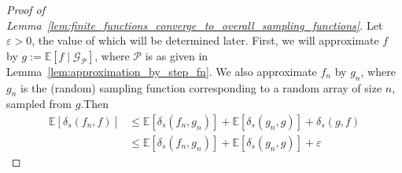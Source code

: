 \documentclass[11pt,oneside,reqno]{article}
\theoremstyle{plain}
\theoremstyle{definition}
\numberwithin{equation}{section}
\renewcommand{\leq}{\leqslant}
\newcommand{\E}{\mathbb{E}}
\begin{document}
\begin{proof}[Proof of Lemma~\ref{lem:finite_functions_converge_to_overall_sampling_functions}]
    Let $\varepsilon > 0$, the value of which will be determined later. First, we will approximate $f$ by $g := \E[f \mid \mathcal G_{\mathcal P}]$, where $\mathcal P$ is as given in Lemma~\ref{lem:approximation_by_step_fn}. We also approximate $f_n$ by $g_n$, where $g_n$ is the (random) sampling function corresponding to a random array of size $n$, sampled from $g$.Then
    \begin{align*}
        \mathbb E[\delta_s(f_n,f)] &\leq \mathbb E[\delta_s(f_n,g_n)] + \E[\delta_s(g_n,g)] + \delta_s(g,f) \\
        &\leq \mathbb E[\delta_s(f_n,g_n)] + \E[\delta_s(g_n,g)] + \varepsilon
    \end{align*}


\end{proof}
\end{document}
